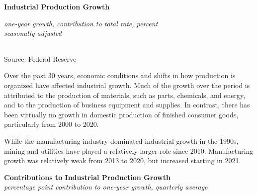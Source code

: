 \documentclass{report}
\newcommand{\tbllink}[1]{\href{https://raw.githubusercontent.com/bdecon/US-chartbook/master/chartbook/data/#1}{\faTable}}
\begin{document}
{\begin{minipage}{0.76\textwidth}
\normalsize \textbf{Industrial Production Growth}\\
\footnotesize{\textit{one-year growth, \hspace{27mm} contribution to total \hspace{10mm} rate, percent}\\
\footnotesize{\textit{seasonally-adjusted}}
\vspace*{-7mm}

\hspace*{-2mm}  \setlength{\tabcolsep}{3.7pt} \color{black!90}
		{\renewcommand{\arraystretch}{1.48}
		 \begin{tabular}{p{2mm} p{38mm} R{6.6mm} R{6.6mm} R{6.6mm} R{6.6mm} | 
		 R{6.8mm} R{6.6mm} R{6.6mm} R{6.6mm} }
			  \hline
		\end{tabular}}\vspace{-2mm}
		
\footnotesize{Source: Federal Reserve} \hfill \tbllink{indpro_table.csv}}
\end{minipage}
\newpage
\begin{minipage}{0.76\textwidth}
\small Over the past 30 years, economic conditions and shifts in how production is organized have affected industrial growth. Much of the growth over the period is attributed to the production of materials, such as parts, chemicals, and energy, and to the production of business equipment and supplies. In contrast, there has been virtually no growth in domestic production of finished consumer goods, particularly from 2000 to 2020. 

While the manufacturing industry dominated industrial growth in the 1990s, mining and utilities have played a relatively larger role since 2010. Manufacturing growth was relatively weak from 2013 to 2020, but increased starting in 2021. 
\vspace{1mm}

\normalsize \textbf{Contributions to Industrial Production Growth}\\
\footnotesize{\textit{percentage point contribution to one-year growth, quarterly average}}
\vspace{2.6cm}


\end{minipage}}
\end{document}
